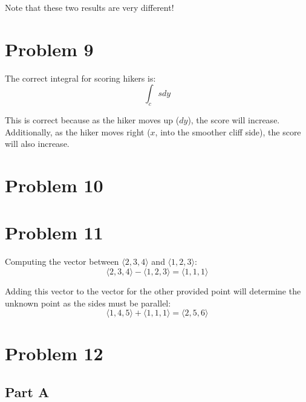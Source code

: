 \documentclass{article}
\begin{document}
Note that these two results are very different!

\section*{Problem 9}

The correct integral for scoring hikers is:
$$ \int_c s dy $$

This is correct because as the hiker moves up ($dy$), the score will increase.
Additionally, as the hiker moves right ($x$, into the smoother cliff side), the
score will also increase.

\section*{Problem 10}

\section*{Problem 11}

Computing the vector between $\langle 2, 3, 4 \rangle$ and $\langle 1, 2, 3
\rangle$:
$$ \langle 2, 3, 4 \rangle - \langle 1, 2, 3 \rangle = \langle 1, 1, 1 \rangle$$

Adding this vector to the vector for the other provided point will determine the
unknown point as the sides must be parallel:
$$ \langle 1, 4, 5 \rangle + \langle 1, 1, 1 \rangle = \langle 2, 5, 6 \rangle
$$

\section*{Problem 12}

\subsection*{Part A}
\end{document}
